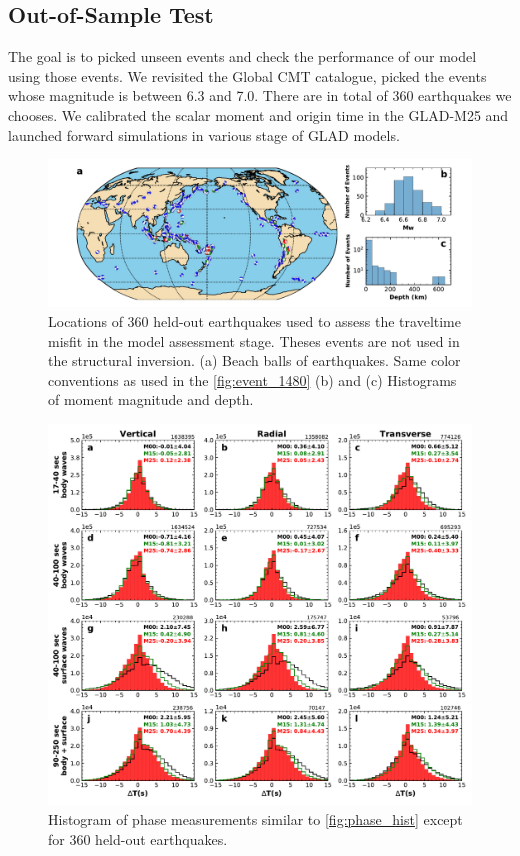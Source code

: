 \documentclass[extra,mreferee]{gji}
\begin{document}
\subsection{Out-of-Sample Test}

The goal is to picked unseen events and check the performance of our model using those events. We revisited the Global CMT catalogue, picked the events whose magnitude is between 6.3 and 7.0. There are in total of 360 earthquakes we chooses. We calibrated the scalar moment and origin time in the GLAD-M25 and launched forward simulations in various stage of GLAD models.

\begin{figure}
\includegraphics[width=\textwidth]{figures/events_360.pdf}
  \caption{Locations of 360 held-out earthquakes used to assess the traveltime misfit in the model assessment stage. Theses events are not used in the structural inversion. (a) Beach balls of earthquakes. Same color conventions as used in the \ref{fig:event_1480} (b) and (c) Histograms of moment magnitude and depth.}
\centering
\end{figure}

\begin{figure}
\includegraphics[width=\textwidth]{figures/dt_histogram_360.pdf}
  \caption{Histogram of phase measurements similar to \ref{fig:phase_hist} except for 360 held-out earthquakes.}
\centering
\end{figure}
\end{document}
